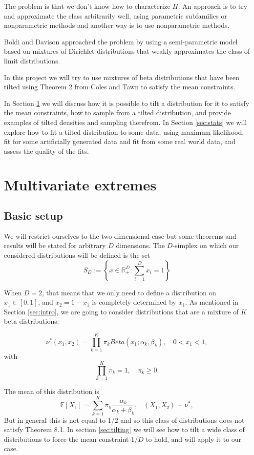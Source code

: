 \documentclass[10pt]{report}
\begin{document}
The problem is that we don't know how to characterize $H$. An approach is to try and approximate the class arbitrarily well, using parametric subfamilies or nonparametric methods and another way is to use nonparametric methods.

Boldi and Davison \cite{BoldiDavison} approached the problem by using a semi-parametric model based on mixtures of Dirichlet distributions that weakly approximates the class of limit distributions.

In this project we will try to use mixtures of beta distributions that have been tilted using Theorem 2 from Coles and Tawn \cite{ColesTawn} to satisfy the mean constraints.

In Section \ref{sec:multivariate} we will discuss how it is possible to tilt a distribution for it to satisfy the mean constraints, how to sample from a tilted distribution, and provide examples of tilted densities and sampling therefrom. 
In Section \ref{sec:stats} we will explore how to fit a tilted distribution to some data, using maximum likelihood, fit for some artificially generated data and fit from some real world data, and assess the quality of the fits.

\chapter{Multivariate extremes}
\label{sec:multivariate}
\section{Basic setup}

We will restrict ourselves to the two-dimensional case but some theorems and results will be stated for arbitrary $D$ dimensions. The $D$-simplex on which our considered distributions will be defined is the set
$$
S_D :=\left\{x \in \mathbb{R}^D_+ : \sum_{i=1}^D x_i = 1\right\}
$$

When $D=2$, that means that we only need to define a distribution on $ x_1 \in [0,1]$, and $x_2 = 1-x_1$ is completely determined by $x_1$. As mentioned in Section \ref{sec:intro}, we are going to consider distributions that are a mixture of $K$ beta distributions:

$$
\nu^*(x_1,x_2) = \prod_{k=1}^K \pi_k Beta(x_1;\alpha_k,\beta_k), \quad  0<x_1<1,
$$
with
$$
\prod_{k=1}^K \pi_k= 1, \quad \pi_k \geq 0 .
$$

The mean of this distribution is
$$
\mathbb{E}[X_1] = \sum_{k=1}^K \pi_k\frac{\alpha_k}{\alpha_k + \beta_k}, \hspace{10pt} (X_1,X_2) \sim \nu^*,
$$
But in general this is not equal to $1/2$ and so this class of distributions does not satisfy Theorem 8.1.
In section \ref{sec:tilting} we will see how to tilt a wide class of distributions to force the mean constraint $1/D$ to hold, and will apply it to our case.
\end{document}
